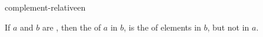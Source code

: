 \begin{modnl}[creators=hang]{complement-relative}{en}
	\begin{definition}[id=C-relative.def]
	If $a$ and $b$ are , then the 
	 of $a$ in $b$, is the 
	 of elements in $b$, but not in $a$.
	\end{definition}
\end{modnl}

